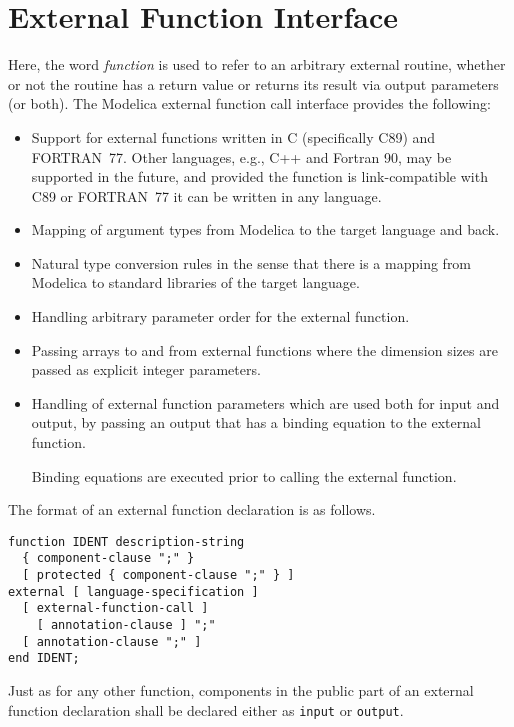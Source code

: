 \section{External Function Interface}\label{external-function-interface}

Here, the word \emph{function} is used to refer to an arbitrary external routine, whether or not the routine has a return value or returns its result via output parameters (or both).
The Modelica external function call interface provides the following:
\begin{itemize}
\item
  Support for external functions written in C (specifically C89) and FORTRAN~77.
  Other languages, e.g., C++ and Fortran 90, may be supported in the future, and provided the function is link-compatible with C89 or FORTRAN~77 it can be written in any language.
\item
  Mapping of argument types from Modelica to the target language and
  back.
\item
  Natural type conversion rules in the sense that there is a mapping from Modelica to standard libraries of the target language.
\item
  Handling arbitrary parameter order for the external function.
\item
  Passing arrays to and from external functions where the dimension sizes are passed as explicit integer parameters.
\item
  Handling of external function parameters which are used both for input and output, by passing an output that has a binding equation to the external function.
  \begin{nonnormative}
  Binding equations are executed prior to calling the external function.
  \end{nonnormative}
\end{itemize}

The format of an external function declaration is as follows.
\begin{lstlisting}[language=grammar]
function IDENT description-string
  { component-clause ";" }
  [ protected { component-clause ";" } ]
external [ language-specification ]
  [ external-function-call ]
    [ annotation-clause ] ";"
  [ annotation-clause ";" ]
end IDENT;
\end{lstlisting}%

Just as for any other function, components in the public part of an external function declaration shall be declared either as {\lstinline!input!} or {\lstinline!output!}.

